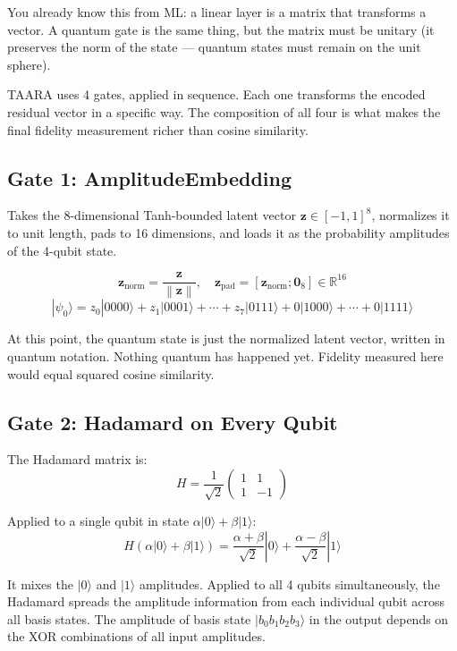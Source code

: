 \documentclass[11pt,a4paper]{article}
\newcommand{\ket}[1]{|#1\rangle}
\newcommand{\norm}[1]{\left\lVert#1\right\rVert}
\begin{document}
You already know this from ML: a linear layer is a matrix that transforms a vector. A quantum gate is the same thing, but the matrix must be unitary (it preserves the norm of the state — quantum states must remain on the unit sphere).

TAARA uses 4 gates, applied in sequence. Each one transforms the encoded residual vector in a specific way. The composition of all four is what makes the final fidelity measurement richer than cosine similarity.

\subsection{Gate 1: AmplitudeEmbedding}

Takes the 8-dimensional Tanh-bounded latent vector $\mathbf{z} \in [-1,1]^8$, normalizes it to unit length, pads to 16 dimensions, and loads it as the probability amplitudes of the 4-qubit state.

\[
\mathbf{z}_{\text{norm}} = \frac{\mathbf{z}}{\norm{\mathbf{z}}}, \quad
\mathbf{z}_{\text{pad}} = [\mathbf{z}_{\text{norm}}; \mathbf{0}_8] \in \mathbb{R}^{16}
\]
\[
\ket{\psi_0} = z_0\ket{0000} + z_1\ket{0001} + \cdots + z_7\ket{0111} + 0\ket{1000} + \cdots + 0\ket{1111}
\]

At this point, the quantum state is just the normalized latent vector, written in quantum notation. Nothing quantum has happened yet. Fidelity measured here would equal squared cosine similarity.

\subsection{Gate 2: Hadamard on Every Qubit}

The Hadamard matrix is:
\[
H = \frac{1}{\sqrt{2}}\begin{pmatrix} 1 & 1 \\ 1 & -1 \end{pmatrix}
\]

Applied to a single qubit in state $\alpha\ket{0} + \beta\ket{1}$:
\[
H(\alpha\ket{0} + \beta\ket{1}) = \frac{\alpha+\beta}{\sqrt{2}}\ket{0} + \frac{\alpha-\beta}{\sqrt{2}}\ket{1}
\]

It mixes the $\ket{0}$ and $\ket{1}$ amplitudes. Applied to all 4 qubits simultaneously, the Hadamard spreads the amplitude information from each individual qubit across all basis states. The amplitude of basis state $\ket{b_0 b_1 b_2 b_3}$ in the output depends on the XOR combinations of all input amplitudes.
\end{document}
